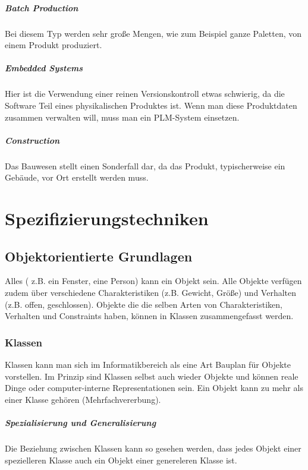 \paragraph{Batch Production}
Bei diesem Typ werden sehr große Mengen, wie zum Beispiel ganze Paletten, von einem Produkt produziert.

\paragraph{Embedded Systems}
Hier ist die Verwendung einer reinen Versionskontroll etwas schwierig, da die Software Teil eines physikalischen Produktes ist. Wenn man diese Produktdaten zusammen verwalten will, muss man ein PLM-System einsetzen.

\paragraph{Construction}
Das Bauwesen stellt einen Sonderfall dar, da das Produkt, typischerweise ein Gebäude, vor Ort erstellt werden muss.

\chapter{Spezifizierungstechniken}

\section{Objektorientierte Grundlagen}
Alles ( z.B. ein Fenster, eine Person) kann ein Objekt sein. Alle Objekte verfügen zudem über verschiedene Charakteristiken (z.B. Gewicht, Größe) und Verhalten (z.B. offen, geschlossen). Objekte die die selben Arten von Charakteristiken, Verhalten und Constraints haben, können in Klassen zusammengefasst werden.

\subsection{Klassen}
Klassen kann man sich im Informatikbereich als eine Art Bauplan für Objekte vorstellen. Im Prinzip sind Klassen selbst auch wieder Objekte und können reale Dinge oder computer-interne Representationen sein. Ein Objekt kann zu mehr als einer Klasse gehören (Mehrfachvererbung).

\paragraph{Spezialisierung und Generalisierung}
Die Beziehung zwischen Klassen kann so gesehen werden, dass jedes Objekt einer spezielleren Klasse auch  ein Objekt einer genereleren Klasse ist.

